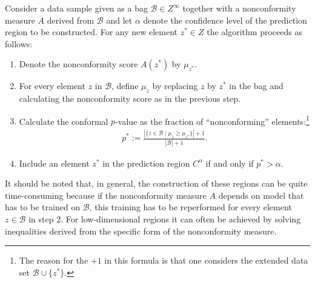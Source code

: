     \begin{construct}\label{data:cp}
        Consider a data sample given as a bag $\mathcal{B}\in Z^\infty$ together with a nonconformity measure $A$ derived from $\mathcal{B}$ and let $\alpha$ denote the confidence level of the prediction region to be constructed. For any new element $z^*\in Z$ the algorithm proceeds as follows:
        \begin{enumerate}
            \item Denote the nonconformity score $A(z^*)$ by $\mu_{z^*}$.
            \item For every element $z$ in $\mathcal{B}$, define $\mu_z$ by replacing $z$ by $z^*$ in the bag and calculating the nonconformity score as in the previous step.
            \item Calculate the conformal $p$-value as the fraction of ``nonconforming'' elements:\footnote{The reason for the $+1$ in this formula is that one considers the extended data set $\mathcal{B}\cup\{z^*\}$.}
                \begin{gather}
                    \label{data:tcp}
                    p^* := \frac{|\{z\in\mathcal{B}\mid\mu_z\geq\mu_{z^*}\}|+1}{|\mathcal{B}|+1}.
                \end{gather}
            \item Include an element $z^*$ in the prediction region $C^\alpha$ if and only if $p^*>\alpha$.
        \end{enumerate}
        It should be noted that, in general, the construction of these regions can be quite time-consuming because if the nonconformity measure $A$ depends on model that has to be trained on $\mathcal{B}$, this training has to be reperformed for every element $z\in\mathcal{B}$ in step 2. For low-dimensional regions it can often be achieved by solving inequalities derived from the specific form of the nonconformity measure.
    \end{construct}

